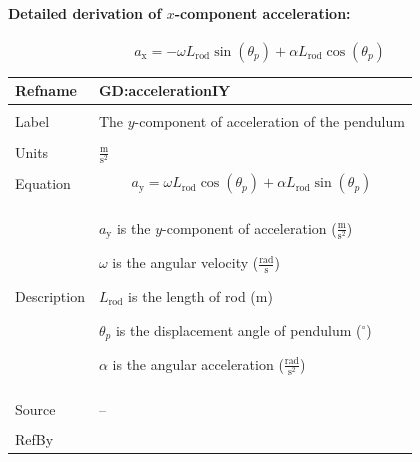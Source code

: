 \documentclass[12pt]{article}
\begin{document}
\paragraph{Detailed derivation of $x$-component acceleration:}
\label{GD:accelerationIXDeriv}
\begin{displaymath}
{a_{\text{x}}}=-ω {L_{\text{rod}}} \sin\left({θ_{p}}\right)+α {L_{\text{rod}}} \cos\left({θ_{p}}\right)
\end{displaymath}
\vspace{\baselineskip}
\noindent
\begin{minipage}{\textwidth}
\begin{tabular}{>{\raggedright}p{}>{\raggedright\arraybackslash}p{}}
\toprule \textbf{Refname} & \textbf{GD:accelerationIY}
\label{GD:accelerationIY}
\\ \midrule \\
Label & The $y$-component of acceleration of the pendulum
        
\\ \midrule \\
Units & $\frac{\text{m}}{\text{s}^{2}}$
        
\\ \midrule \\
Equation & \begin{displaymath}
           {a_{\text{y}}}=ω {L_{\text{rod}}} \cos\left({θ_{p}}\right)+α {L_{\text{rod}}} \sin\left({θ_{p}}\right)
           \end{displaymath}
\\ \midrule \\
Description & \begin{symbDescription}
              \item{${a_{\text{y}}}$ is the $y$-component of acceleration ($\frac{\text{m}}{\text{s}^{2}}$)}
              \item{$ω$ is the angular velocity ($\frac{\text{rad}}{\text{s}}$)}
              \item{${L_{\text{rod}}}$ is the length of rod (${\text{m}}$)}
              \item{${θ_{p}}$ is the displacement angle of pendulum (${{}^{\circ}}$)}
              \item{$α$ is the angular acceleration ($\frac{\text{rad}}{\text{s}^{2}}$)}
              \end{symbDescription}
\\ \midrule \\
Source & --
         
\\ \midrule \\
RefBy & 
\\ \bottomrule
\end{tabular}
\end{minipage}
\end{document}
